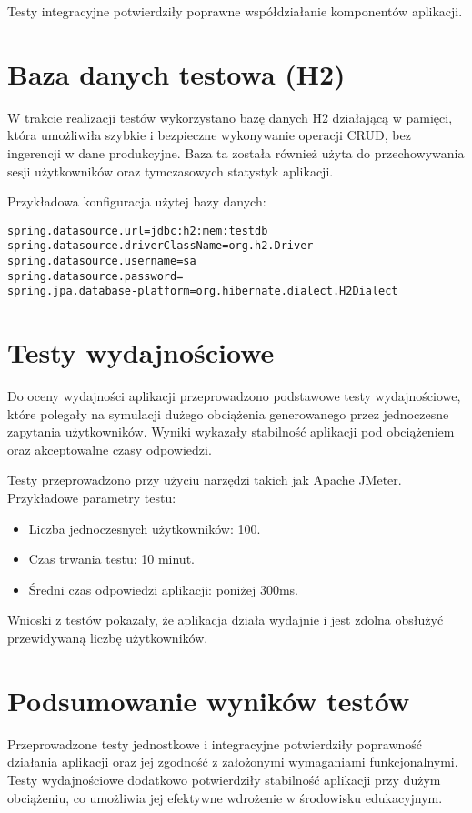 Testy integracyjne potwierdziły poprawne współdziałanie komponentów aplikacji.

\section{Baza danych testowa (H2)}

W trakcie realizacji testów wykorzystano bazę danych H2 działającą w pamięci, która umożliwiła szybkie i bezpieczne wykonywanie operacji CRUD, bez ingerencji w dane produkcyjne. Baza ta została również użyta do przechowywania sesji użytkowników oraz tymczasowych statystyk aplikacji. 

Przykładowa konfiguracja użytej bazy danych:

\begin{lstlisting}[language=properties]
spring.datasource.url=jdbc:h2:mem:testdb
spring.datasource.driverClassName=org.h2.Driver
spring.datasource.username=sa
spring.datasource.password=
spring.jpa.database-platform=org.hibernate.dialect.H2Dialect
\end{lstlisting}

\section{Testy wydajnościowe}

Do oceny wydajności aplikacji przeprowadzono podstawowe testy wydajnościowe, które polegały na symulacji dużego obciążenia generowanego przez jednoczesne zapytania użytkowników. Wyniki wykazały stabilność aplikacji pod obciążeniem oraz akceptowalne czasy odpowiedzi.

Testy przeprowadzono przy użyciu narzędzi takich jak Apache JMeter. Przykładowe parametry testu:

\begin{itemize}
    \item Liczba jednoczesnych użytkowników: 100.
    \item Czas trwania testu: 10 minut.
    \item Średni czas odpowiedzi aplikacji: poniżej 300ms.
\end{itemize}

Wnioski z testów pokazały, że aplikacja działa wydajnie i jest zdolna obsłużyć przewidywaną liczbę użytkowników.

\section{Podsumowanie wyników testów}

Przeprowadzone testy jednostkowe i integracyjne potwierdziły poprawność działania aplikacji oraz jej zgodność z założonymi wymaganiami funkcjonalnymi. Testy wydajnościowe dodatkowo potwierdziły stabilność aplikacji przy dużym obciążeniu, co umożliwia jej efektywne wdrożenie w środowisku edukacyjnym.
